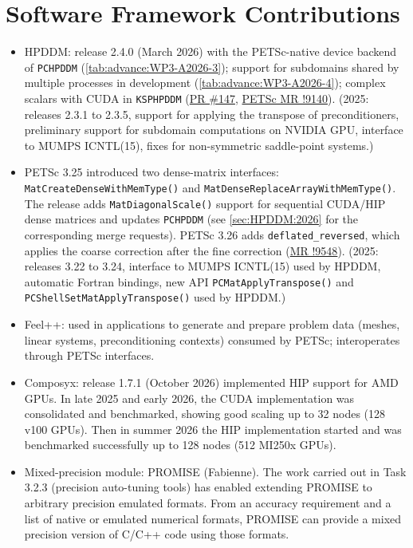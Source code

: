 \section{Software Framework Contributions}
\begin{itemize}
  \item HPDDM: release 2.4.0 (March 2026) with the PETSc-native device backend of \texttt{PCHPDDM} (\cref{tab:advance:WP3-A2026-3}); support for subdomains shared by multiple processes in development (\cref{tab:advance:WP3-A2026-4}); complex scalars with CUDA in \texttt{KSPHPDDM} (\href{https://github.com/hpddm/hpddm/pull/147}{PR \#147}, \href{https://gitlab.com/petsc/petsc/-/merge_requests/9140}{PETSc MR !9140}). (2025: releases 2.3.1 to 2.3.5, support for applying the transpose of preconditioners, preliminary support for subdomain computations on NVIDIA GPU, interface to MUMPS ICNTL(15), fixes for non-symmetric saddle-point systems.)
  \item PETSc 3.25 introduced two dense-matrix interfaces:
        \texttt{MatCreateDenseWithMemType()} and
        \texttt{MatDenseReplaceArrayWithMemType()}.
        The release adds \texttt{MatDiagonalScale()} support for sequential
        CUDA/HIP dense matrices and updates \texttt{PCHPDDM}
        (see \cref{sec:HPDDM:2026} for the corresponding merge requests).
        PETSc 3.26 adds \texttt{deflated\_reversed}, which applies the
        coarse correction after the fine correction
        (\href{https://gitlab.com/petsc/petsc/-/merge_requests/9548}{MR !9548}).
        (2025: releases 3.22 to 3.24, interface to MUMPS ICNTL(15) used by HPDDM,
        automatic Fortran bindings, new API \texttt{PCMatApplyTranspose()} and
        \texttt{PCShellSetMatApplyTranspose()} used by HPDDM.)
  \item Feel++: used in applications to generate and prepare problem data (meshes, linear systems, preconditioning contexts) consumed by PETSc; interoperates through PETSc interfaces.
  \item Composyx: release 1.7.1 (October 2026) implemented HIP support for AMD GPUs. In late 2025 and early 2026, the CUDA implementation was consolidated and benchmarked, showing good scaling up to 32 nodes (128 v100 GPUs). Then in summer 2026 the HIP implementation started and was benchmarked successfully up to 128 nodes (512 MI250x GPUs).
  \item Mixed-precision module: PROMISE (Fabienne). The work carried out in Task 3.2.3 (precision auto-tuning tools) has enabled extending PROMISE to arbitrary precision emulated formats. From an accuracy requirement and a list of native or emulated numerical formats, PROMISE can provide a mixed precision version of C/C++ code using those formats.
\end{itemize}

